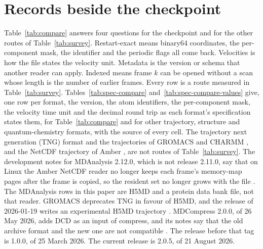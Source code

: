 \documentclass[preprint,12pt]{elsarticle}
\begin{document}
\FloatBarrier \section{Records beside the checkpoint}\label{sec:supp-neighbours} Table~\ref{tab:compare} answers four questions for the checkpoint and for the other routes of Table~\ref{tab:survey}.
Restart-exact means binary64 coordinates, the per-component mask, the identifier and the periodic flags all come back.
Velocities is how the file states the velocity unit.
Metadata is the version or schema that another reader can apply.
Indexed means frame \(k\) can be opened without a scan whose length is the number of earlier frames.
Every row is a route measured in Table~\ref{tab:survey}.
Tables~\ref{tab:spec-compare} and~\ref{tab:spec-compare-values} give, one row per format, the version, the atom identifiers, the per-component mask, the velocity time unit and the decimal round trip as each format's specification states them, for Table~\ref{tab:compare} and for other trajectory, structure and quantum-chemistry formats, with the source of every cell.
The trajectory next generation (TNG) format and the trajectories of GROMACS and CHARMM \cite{spangbergTrajectoryNgPortable2011,lundborgEfficientExtensibleFormat2014,abrahamGromacsHighPerformance2015,brooksCharmmBiomolecularSimulation2009}, and the NetCDF trajectory of Amber \cite{caseAmberBiomolecularSimulation2005,amberNetcdfConvention2026,rewNetcdfInterfaceScientific1990}, are not routes of Table~\ref{tab:survey}.
The development notes for MDAnalysis 2.12.0, which is not release 2.11.0, say that on Linux the Amber NetCDF reader no longer keeps each frame's memory-map pages after the frame is copied, so the resident set no longer grows with the file \cite{mdanalysisNcdfMmap2026}.
The MDAnalysis rows in this paper are H5MD and a protein data bank file, not that reader.
GROMACS deprecates TNG in favour of H5MD, and the release of 2026-01-19 writes an experimental H5MD trajectory \cite{gromacsManual2026}.
MDCompress 2.0.0, of 26 May 2026, adds DCD as an input of compress, and its notes say that the old archive format and the new one are not compatible \cite{kokotMdcompress2002026}.
The release before that tag is 1.0.0, of 25 March 2026.
The current release is 2.0.5, of 21 August 2026.
\end{document}
